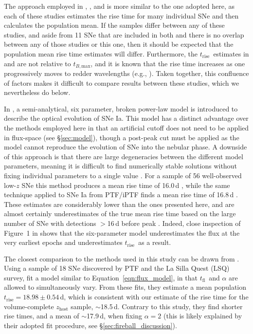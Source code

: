 \documentclass[twocolumn]{aastex63}
\newcommand{\tfl}{$t_\mathrm{fl}$}
\newcommand{\trise}{$t_\mathrm{rise}$}
\newcommand{\tbmax}{$t_{B,\mathrm{max}}$}
\begin{document}
The approach employed in \citet{Zheng17a}, \citet{Papadogiannakis19}, and
\citet{Firth15} is more similar to the one adopted here, as each of these
studies estimates the rise time for many individual SNe and then calculates
the population mean. If the samples differ between any of these studies, and
aside from 11 SNe that are included in both \citet{Papadogiannakis19} and
\citet{Firth15} there is no overlap between any of those studies or this one,
then it should be expected that the population mean rise time estimates will
differ. Furthermore, the \trise\ estimates in \citet{Papadogiannakis19} and
\citet{Firth15} are not relative to \tbmax, and it is known that the rise time
increases as one progressively moves to redder wavelengths (e.g.,
\citealt{Ganeshalingam11}). Taken together, this confluence of factors makes
it difficult to compare results between these studies, which we nevertheless
do below.

In \citet{Zheng17}, a semi-analytical, six parameter, broken power-law model
is introduced to describe the optical evolution of SNe Ia. This model has a
distinct advantage over the methods employed here in that an artificial cutoff
does not need to be applied in flux-space (see \S\ref{sec:model}), though a
post-peak cut must be applied as the model cannot reproduce the evolution of
SNe into the nebular phase. A downside of this approach is that there are
large degeneracies between the different model parameters, meaning it is
difficult to find numerically stable solutions without fixing individual
parameters to a single value \citep{Zheng17a}. For a sample of 56
well-observed low-$z$ SNe this method produces a mean rise time of 16.0\,d
\citep{Zheng17a}, while the same technique applied to SNe Ia from PTF/iPTF
finds a mean rise time of 16.8\,d \citep{Papadogiannakis19}. These estimates
are considerably lower than the ones presented here, and are almost certainly
underestimates of the true mean rise time based on the large number of SNe
with detections $>$16\,d before peak \citep{Papadogiannakis19, Yao19}. Indeed,
close inspection of Figure~1 in \citet{Zheng17a} shows that the six-parameter
model underestimates the flux at the very earliest epochs and underestimates
\trise\ as a result.

The closest comparison to the methods used in this study can be drawn from
\citet{Firth15}. Using a sample of 18 SNe discovered by PTF and the La Silla
Quest (LSQ) survey, \citeauthor{Firth15} fit a model similar to
Equation~\ref{eqn:flux_model}, in that \tfl\ and $\alpha$ are allowed to
simultaneously vary. From these fits, they estimate a mean population \trise$
= 18.98 \pm 0.54$\,d, which is consistent with our estimate of the rise time
for the volume-complete $z_\mathrm{host}$ sample, $\sim$18.5\,d. Contrary to
this study, they find shorter rise times, and a mean of $\sim$17.9\,d, when
fixing $\alpha = 2$ (this is likely explained by their adopted fit procedure,
see \S\ref{sec:fireball_discussion}).
\end{document}
